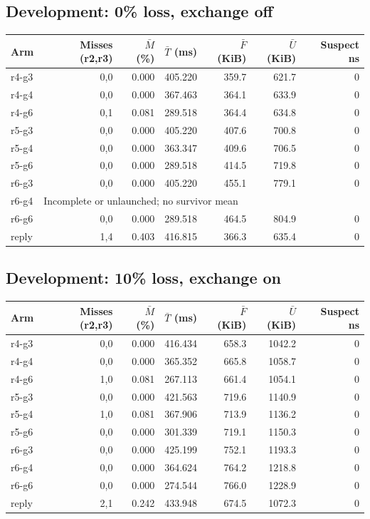 \subsection*{Development: 0\% loss, exchange off}
\begin{center}\small
\begin{tabular}{lrrrrrr}
Arm & Misses (r2,r3) & $\bar M$ (\%) & $\bar T$ (ms) & $\bar F$ (KiB) & $\bar U$ (KiB) & Suspect ns \\ \hline
r4-g3 & 0,0 & 0.000 & 405.220 & 359.7 & 621.7 & 0 \\
r4-g4 & 0,0 & 0.000 & 367.463 & 364.1 & 633.9 & 0 \\
r4-g6 & 0,1 & 0.081 & 289.518 & 364.4 & 634.8 & 0 \\
r5-g3 & 0,0 & 0.000 & 405.220 & 407.6 & 700.8 & 0 \\
r5-g4 & 0,0 & 0.000 & 363.347 & 409.6 & 706.5 & 0 \\
r5-g6 & 0,0 & 0.000 & 289.518 & 414.5 & 719.8 & 0 \\
r6-g3 & 0,0 & 0.000 & 405.220 & 455.1 & 779.1 & 0 \\
r6-g4 & \multicolumn{6}{l}{Incomplete or unlaunched; no survivor mean} \\
r6-g6 & 0,0 & 0.000 & 289.518 & 464.5 & 804.9 & 0 \\
reply & 1,4 & 0.403 & 416.815 & 366.3 & 635.4 & 0 \\
\end{tabular}\end{center}
\Needspace{190pt}
\subsection*{Development: 10\% loss, exchange on}
\begin{center}\small
\begin{tabular}{lrrrrrr}
Arm & Misses (r2,r3) & $\bar M$ (\%) & $\bar T$ (ms) & $\bar F$ (KiB) & $\bar U$ (KiB) & Suspect ns \\ \hline
r4-g3 & 0,0 & 0.000 & 416.434 & 658.3 & 1042.2 & 0 \\
r4-g4 & 0,0 & 0.000 & 365.352 & 665.8 & 1058.7 & 0 \\
r4-g6 & 1,0 & 0.081 & 267.113 & 661.4 & 1054.1 & 0 \\
r5-g3 & 0,0 & 0.000 & 421.563 & 719.6 & 1140.9 & 0 \\
r5-g4 & 1,0 & 0.081 & 367.906 & 713.9 & 1136.2 & 0 \\
r5-g6 & 0,0 & 0.000 & 301.339 & 719.1 & 1150.3 & 0 \\
r6-g3 & 0,0 & 0.000 & 425.199 & 752.1 & 1193.3 & 0 \\
r6-g4 & 0,0 & 0.000 & 364.624 & 764.2 & 1218.8 & 0 \\
r6-g6 & 0,0 & 0.000 & 274.544 & 766.0 & 1228.9 & 0 \\
reply & 2,1 & 0.242 & 433.948 & 674.5 & 1072.3 & 0 \\
\end{tabular}\end{center}
\Needspace{190pt}
